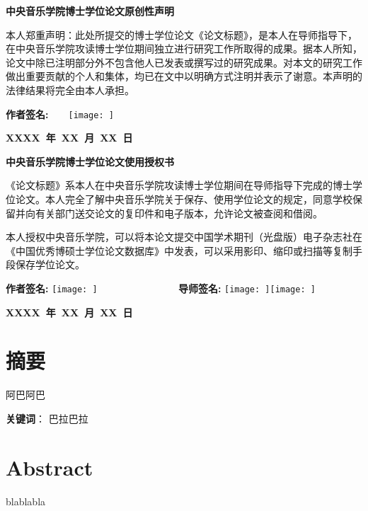 \documentclass[a4paper,scheme=chinese,linespread=1.6]{ctexbook}
\newcommand{\thetitle}{论文标题}
\begin{document}
{\large%

\setlength{\columnsep}{0pt}

{\centering \fontsize{16pt}{16pt}\textbf{中央音乐学院博士学位论文原创性声明}\par}
\vspace{0.3cm}
本人郑重声明：此处所提交的博士学位论文《\thetitle 》，是本人在导师指导下，在中央音乐学院攻读博士学位期间独立进行研究工作所取得的成果。据本人所知，论文中除已注明部分外不包含他人已发表或撰写过的研究成果。对本文的研究工作做出重要贡献的个人和集体，均已在文中以明确方式注明并表示了谢意。本声明的法律结果将完全由本人承担。

\begin{multicols}{2}
	\vfill\null
	\columnbreak
	\textbf{作者签名:}~~~~\texttt{[image: ]} %
	\par
	\vspace{0.3cm}
\end{multicols}
\hfill \textbf{XXXX~年~XX~月~XX~日}
\vfill

{\centering \fontsize{16pt}{16pt}\textbf{中央音乐学院博士学位论文使用授权书}\par}
\vspace{0.3cm}
《\thetitle 》系本人在中央音乐学院攻读博士学位期间在导师指导下完成的博士学位论文。本人完全了解中央音乐学院关于保存、使用学位论文的规定，同意学校保留并向有关部门送交论文的复印件和电子版本，允许论文被查阅和借阅。

本人授权中央音乐学院，可以将本论文提交中国学术期刊（光盘版）电子杂志社在《中国优秀博硕士学位论文数据库》中发表，可以采用影印、缩印或扫描等复制手段保存学位论文。

\textbf{作者签名: }\texttt{[image: ]} %
~~~~~~~~~~~~~~~
\textbf{导师签名: }\texttt{[image: ]}\texttt{[image: ]} %
\par
\hspace{1cm}

\hfill \textbf{XXXX~年~XX~月~XX~日}
\chapter*{摘要}
阿巴阿巴
\pagestyle{plain}





\textbf{关键词}：
巴拉巴拉
\chapter*{Abstract}
blablabla

}
\end{document}
